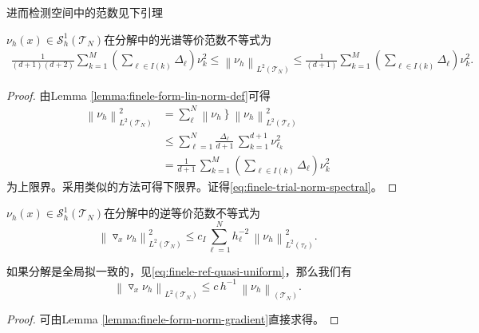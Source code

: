 进而检测空间中的范数见下引理
\begin{lemma}[光谱等价范数不等式]
  \label{lemma:finele-trial-norm-spectral}
  $\nu_{h}(x) \in \mathcal{S}_{h}^{1}\left(\mathcal{T}_{N} \right)$在分解中的光谱等价范数不等式为
  \begin{equation}
    \label{eq:finele-trial-norm-spectral}
    \begin{split}
      \frac{1}{\left( d+1 \right)\left( d+2 \right)}
      \sum_{k=1}^{M}
      \left(\sum_{\ell \in I(k)} \Delta_{\ell} \right)
      \nu_{k}^{2}
      \le \left\|\nu_{h}\right\|_{L^{2}\left(\mathcal{T}_{N} \right)}
      \le \frac{1}{\left( d+1 \right)}
      \sum_{k=1}^{M}
      \left(\sum_{\ell \in I(k)} \Delta_{\ell} \right)
      \nu_{k}^{2}.
    \end{split}
  \end{equation}
\end{lemma}
\begin{proof}
  由Lemma \ref{lemma:finele-form-lin-norm-def}可得
  \begin{equation*}
    \begin{split}
      \left\| \nu_{h} \right\|_{L^{2} \left( \mathcal{T}_{N} \right)}^{2}
      & = \sum_{\ell}^{N} \left\| \nu_{h} \right\}
      \left\| \nu_{h} \right\|_{L^{2} \left( \mathcal{T}_{\ell} \right)}^{2} \\
      & \le \sum_{\ell=1}^{N}
      \frac{\Delta_{\ell}}{d+1} \,
      \sum_{k=1}^{d+1} \nu_{\ell_{k}}^{2} \\
      & = \frac{1}{d+1} \,
      \sum_{k=1}^{M} \left( \sum_{\ell \in I(k)}  \Delta_{\ell} \right)
      \nu_{k}^{2}
    \end{split}
  \end{equation*}
  为上限界。采用类似的方法可得下限界。证得\eqref{eq:finele-trial-norm-spectral}。
\end{proof}

\begin{lemma}[逆等价范数不等式]
  \label{finele-trial-norm-inverse}
  $\nu_{h}(x) \in \mathcal{S}_{h}^{1}\left(\mathcal{T}_{N} \right)$在分解中的逆等价范数不等式为
  \begin{equation}
    \label{eq:finele-trial-norm-inverse-local}
    \left\| \triangledown_{x} \nu_{h} \right\|_{L^{2} \left(\mathcal{T}_{N} \right)}^{2}
    \le c_{I} \sum_{\ell=1}^{N} h_{\ell}^{-2} \,
    \left\| \nu_{h} \right\|_{L^{2}(\tau_{\ell} )}^{2}.
  \end{equation}

  如果分解是全局拟一致的，见\eqref{eq:finele-ref-quasi-uniform}，那么我们有
  \begin{equation}
    \label{eq:finele-trial-norm-inverse-global}
    \left\| \triangledown_{x} \nu_{h} \right\|_{L^{2} \left(\mathcal{T}_{N} \right)}
    \le c \, h^{-1} \,
    \left\| \nu_{h} \right\|_{\left( \mathcal{T}_{N} \right)}.
  \end{equation}
\end{lemma}
\begin{proof}
可由Lemma  \ref{lemma:finele-form-norm-gradient}直接求得。
\end{proof}

